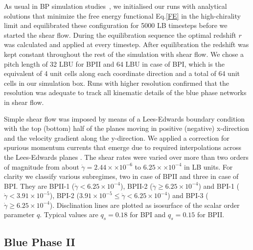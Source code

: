 \documentclass[aps,pre,reprint,superscriptaddress, twocolumn]{revtex4}
\newcommand{\e}[1]{\times10^{#1}}
\newcommand{\gd}{\dot{\gamma}}
\begin{document}
As usual in BP simulation studies~\cite{Henrich:2011a,Henrich:2010b}, we initialised our runs with 
analytical solutions that minimize the free energy functional Eq.\ref{FE} in the high-chirality limit 
and equilibrated these configuration for 5000 LB timesteps before we started the shear flow. 
During the equilibration sequence the optimal redshift $r$ was calculated and applied at every timestep.
After equilibration the redshift was kept constant throughout the rest of the simulation with shear flow.
We chose a pitch length of 32 LBU for BPII and 64 LBU in case of BPI, which is the equivalent 
of 4 unit cells along each coordinate direction and a total of 64 unit cells in our simulation box.
Runs with higher resolution confirmed that the resolution was adequate to track  
all kinematic details of the blue phase networks in shear flow.

Simple shear flow was imposed by means of a Lees-Edwards boundary condition ~\cite{Wagner:2002} with
the top (bottom) half of the planes moving in positive (negative) x-direction and the 
velocity gradient along the y-direction.
We applied a correction for spurious momentum currents that emerge due to required interpolations across 
the Lees-Edwards planes \cite{Henrich:2012a}.
The shear rates were varied over more than two orders of magnitude from about 
$\gd=2.44\times \e{-6}$ to $6.25\times\e{-4}$ in LB units.
For clarity we classify various subregimes, two in case of BPII and three in case of BPI. 
They are BPII-1 ($\gd < 6.25\e{-4}$), BPII-2 ($\gd\ge 6.25\e{-4}$) and
BPI-1 ($\gd < 3.91\e{-5}$), BPI-2 ($3.91\e{-5}\le\gd< 6.25\e{-4}$) and BPI-3 ($\gd\ge 6.25\e{-4}$). 
Disclination lines are plotted as isosurface of the scalar order parameter $q$. Typical values 
are $q_s=0.18$ for BPI and $q_s=0.15$ for BPII.


\subsection{Blue Phase II}
\end{document}
